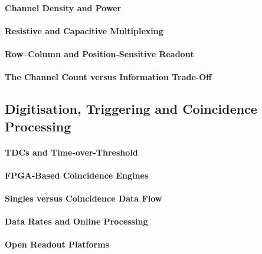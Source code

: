 \paragraph{Channel Density and Power}

\paragraph{Resistive and Capacitive Multiplexing}

\paragraph{Row--Column and Position-Sensitive Readout}

\paragraph{The Channel Count versus Information Trade-Off}

\subsection{Digitisation, Triggering and Coincidence Processing}

\paragraph{TDCs and Time-over-Threshold}

\paragraph{FPGA-Based Coincidence Engines}

\paragraph{Singles versus Coincidence Data Flow}

\paragraph{Data Rates and Online Processing}

\paragraph{Open Readout Platforms}

